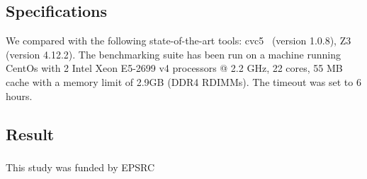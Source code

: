 \documentclass[runningheads]{llncs}
\begin{document}
\subsection*{Specifications}

We compared \dlinear with the following state-of-the-art tools: cvc5~\cite{ref:cvc5} (version 1.0.8), Z3~\cite{ref:z3} (version 4.12.2).
The benchmarking suite has been run on a machine running CentOs with 2 Intel Xeon E5-2699 v4 processors @ 2.2 GHz, 22 cores, 55 MB cache with a memory limit of 2.9GB (DDR4 RDIMMs).
The timeout was set to 6 hours.

\subsection*{Result}


\begin{credits}
    \subsubsection{\ackname} This study was funded by EPSRC
\end{credits}




\end{document}

